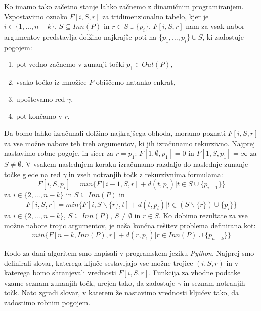 \documentclass[a4paper, 11pt]{article}
\begin{document}
Ko imamo tako začetno stanje lahko začnemo z  dinamičnim programiranjem. Vzpostavimo oznako $F[i,S,r]$ za tridimenzionalno tabelo, kjer 
je $i \in \{1, \ldots , n-k\}$, $S \subseteq Inn(P)$ in $r \in S \cup \{p_i\}$. $F[i,S,r]$ nam za vsak nabor argumentov predstavlja dolžino najkrajše
poti na $\{p_1, \ldots, p_i\} \cup S$, ki zadostuje pogojem:
\begin{enumerate}
    \item pot vedno začnemo v zunanji točki $p_1 \in Out(P)$,
    \vspace{-3mm}
    \item vsako točko iz množice $P$ obiščemo natanko enkrat,
    \vspace{-3mm}
    \item upoštevamo red $\gamma$,
    \vspace{-3mm}
    \item pot končamo v $r$.
\end{enumerate}
Da bomo lahko izračunali dolžino najkrajšega obhoda, moramo poznati $F[i,S,r]$ za vse možne nabore teh treh argumentov, ki jih izračunamo
rekurzivno. Najprej nastavimo robne pogoje, in sicer za $r=p_1$: $F[1,\emptyset, p_1] = 0$ in $F[1,S,p_1] = \infty$ za $S\neq \emptyset$. 
V vsakem naslednjem koraku izračunamo razdaljo do naslednje zunanje točke glede na red $\gamma$ in vseh notranjih točk z rekurzivnima formulama:
\begin{equation}
    F[i,S,p_i] = min\{F[i-1, S,r]+d(t,p_i)|t \in S \cup \{p_{i-1}\}\}
\end{equation}
za $i \in \{2, \ldots, n-k\}$ in $S \subseteq Inn(P)$ in 
\begin{equation}
    F[i,S,r] = min\{F[i, S\backslash \{r\},t] + d(t,p_i)| t \in (S\backslash\{r\})\cup \{p_i\}\}
\end{equation}
za $i\in \{2,\ldots,n-k\}$, $S\subseteq Inn(P)$, $S\neq \emptyset$ in $r \in S$.
Ko dobimo rezultate za vse možne nabore trojic argumentov, je naša končna rešitev problema definirana kot: 
\begin{equation}
    min\{F[n-k,Inn(P),r] + d(r,p_1)|r\in Inn(P)\cup \{p_{n-k}\}\}
\end{equation}

Kodo za dani algoritem smo napisali v programskem jeziku \emph{Python}. Najprej smo definirali slovar, katerega ključe sestavljajo
vse možne trojice $(i,S,r)$ in v katerega bomo shranjevali vrednosti $F[i,S,r]$. Funkcija za vhodne podatke vzame 
seznam zunanjih točk, urejen tako, da zadostuje $\gamma$ in seznam notranjih točk. Nato zgradi slovar, v katerem že nastavimo
vrednosti ključev tako, da zadostimo robnim pogojem.
\end{document}
